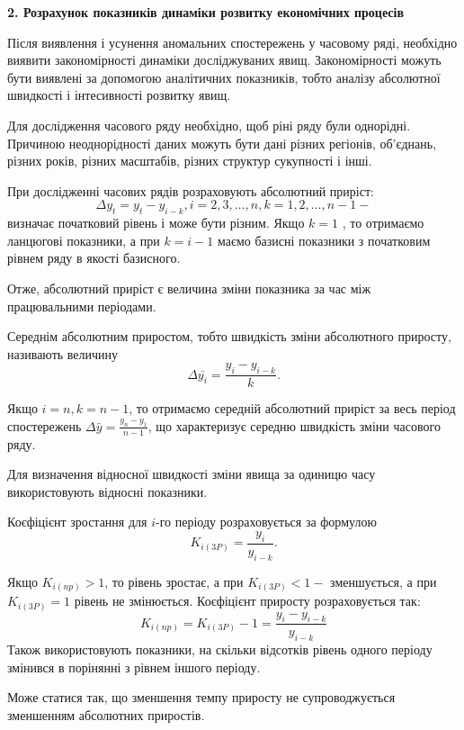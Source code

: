 \documentclass[a4paper, fontsize=14pt, oneside]{scrartcl}
\begin{document}
	\begin{center}
		\Large{\textbf{2. Розрахунок показників динаміки розвитку економічних процесів}}
		\end{center}
        
        Після виявлення і усунення аномальних спостережень у часовому ряді, необхідно виявити закономірності динаміки досліджуваних явищ. Закономірності можуть бути виявлені за допомогою аналітичних показників, тобто аналізу абсолютної швидкості і інтесивності розвитку явищ.
        
        Для дослідження часового ряду необхідно, щоб ріні ряду були однорідні. Причиною неоднорідності даних можуть бути дані різних регіонів, об'єднань, різних років, різних масштабів, різних структур сукупності і інші.
        
        При дослідженні часових рядів розраховують абсолютний приріст:
        \[ \Delta y_{t} = y_{t} - y_{i-k}, i = 2, 3, \dots, n, k = 1, 2, \dots, n-1  - \]
       визначає початковий рівень і може бути різним. Якщо $ k = 1 $ , то отримаємо ланцюгові показники, а при $ k = i - 1 $ маємо базисні показники з початковим рівнем ряду в якості базисного.
       
       Отже, абсолютний приріст є величина зміни показника за час між працювальними періодами.
       
       Середнім абсолютним приростом, тобто швидкість зміни абсолютного приросту, називають величину \[ \Delta \bar{y_{i}} =\frac{y_{i} - y_{i-k}}{k}.\] 
       
       Якщо $ i = n, k = n - 1 $, то отримаємо середній абсолютний приріст за весь період спостережень $ \Delta \bar{y} =\frac{y_{n} - y_{1}}{n - 1} $, що характеризує середню швидкість зміни часового ряду.
       
       Для визначення відносної швидкості зміни явища за одиницю часу використовують відносні показники.
       
       Коєфіцієнт зростання для $ i $-го періоду розраховується за формулою \[ K_{i(3P)}=\frac{y_{i}}{y_{i-k}}.\]
       
       Якщо $ K_{i(np)} > 1 $, то рівень зростає, а при $ K_{i(3P)} < 1 - $ зменшується, а при  $ K_{i(3P)} = 1 $ рівень не змінюється.
       Коєфіцієнт приросту розраховується так: \[ K_{i(np)} = K_{i(3P)} -1 = \frac{y_{i}-y_{i-k}}{y_{i-k}} \]
       Також використовують показники, на скільки відсотків рівень одного періоду змінився в порінянні з рівнем іншого періоду.
       
       Може статися так, що зменшення темпу приросту не супроводжується зменшенням абсолютних приростів.
       
\end{document}

